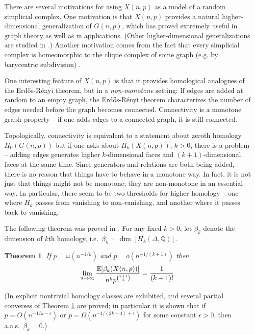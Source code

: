 \documentclass{amsart}
\newtheorem{theorem}[thm]{Theorem}
\theoremstyle{definition}
\newcommand{\E}{\mathbb{E}}
\renewcommand{\1}{\mathbb{1}}
\begin{document}
There are several motivations for using 
 $X(n,p)$ as a model of a 
random simplicial complex.  One motivation is that $X(n,p)$ provides a
natural higher-dimensional generalization of $G(n,p)$, which has
proved extremely useful in graph theory as well as in applications.  (Other
higher-dimensional generalizations are studied in \cite{bhk, Linial, Meshulam}.)  Another
motivation comes from the fact that every simplicial complex is
homeomorphic to the clique complex of some graph (e.g. by barycentric
subdivision) \cite{Hatcher}.

One interesting feature of $X(n,p)$ is that it provides homological
analogues of the Erd\H{o}s-R\'enyi theorem, but in a {\it
  non-monotone} setting: If edges are
added at random to an empty graph, the Erd\H{o}s-R\'enyi theorem
characterizes the number of edges needed
before the graph becomes connected.  Connectivity is a monotone
graph property -- if one adds edges to a connected graph, it is still
connected.

Topologically, connectivity is equivalent to a statement about zeroth
homology $H_0(G(n,p))$ but if one asks about $H_k(X(n,p))$, $k>0$,
there is a problem -- adding edges generates higher $k$-dimensional
faces and $(k+1)$-dimensional faces at the same time.  Since
generators and relations are both being added, there is no reason that
things have to behave in a monotone way.  In fact, it 
is not just that things might not be monotone; they are non-monotone in an essential way.  In
particular, there seem to be two thresholds for higher homology -- one
where $H_k$ passes from vanishing to non-vanishing, and another where
it passes back to vanishing.

The following theorem was proved in
 \cite{clique}. For any fixed
$k>0$, let $\beta_k$ denote the dimension of $k$th homology,
i.e.\ $\beta_k = \dim [ H_k (\Delta, \mathbb{Q}) ].$

\begin{theorem}\label{exp_er} 
If $p = \omega(n^{-1/k})$ and $p=o( n^{-1/(k+1)})$ then $$ \lim_{n \to
  \infty}{\E[\beta_k (X(n,p))] \over n^k p^{k+1 \choose 2} } = {1 \over
  ( k+1)!}.$$
\end{theorem}

(In \cite{clique} explicit nontrivial homology classes are exhibited, and several
partial converses of Theorem \ref{exp_er} are proved; in particular it is shown that if $p =
O(n^{-1/k - \epsilon})$ or $p = \Omega( n^{-1/(2k+1) + \epsilon})$ for
some constant $\epsilon > 0$, then a.a.s.\ $\beta_k = 0$.)
\end{document}
